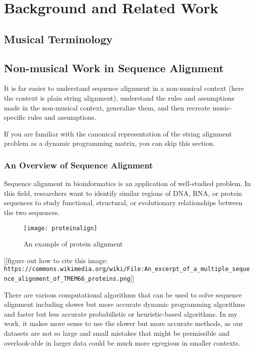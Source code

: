 \chapter{Background and Related Work}
\section{Musical Terminology}
\section{Non-musical Work in Sequence Alignment}
It is far easier to understand sequence alignment in a non-musical context (here the context is plain string alignment), understand the rules and assumptions made in the non-musical context, generalize them, and then recreate music-specific rules and assumptions. 

If you are familiar with the canonical representation of the string alignment problem as a dynamic programming matrix, you can skip this section. 

\subsection{An Overview of Sequence Alignment}
Sequence alignment in bioinformatics is an application of well-studied problem. In this field, researchers want to identify similar regions of DNA, RNA, or protein sequences to study functional, structural, or evolutionary relationships between the two sequences.

\begin{figure}[!ht]

\centering
\texttt{[image: proteinalign]}
\caption{An example of protein alignment}
\end{figure}

[[figure out how to cite this image: \verb|https://commons.wikimedia.org/wiki/File:An_excerpt_of_a_multiple_sequence_alignment_of_TMEM66_proteins.png|]]

There are various computational algorithms that can be used to solve sequence alignment including slower but more accurate dynamic programming algorithms and faster but less accurate probabilistic or heuristic-based algorithms. In my work, it makes more sense to use the slower but more accurate methods, as our datasets are not so large and small mistakes that might be permissible and overlook-able in larger data could be much more egregious in smaller contexts.

